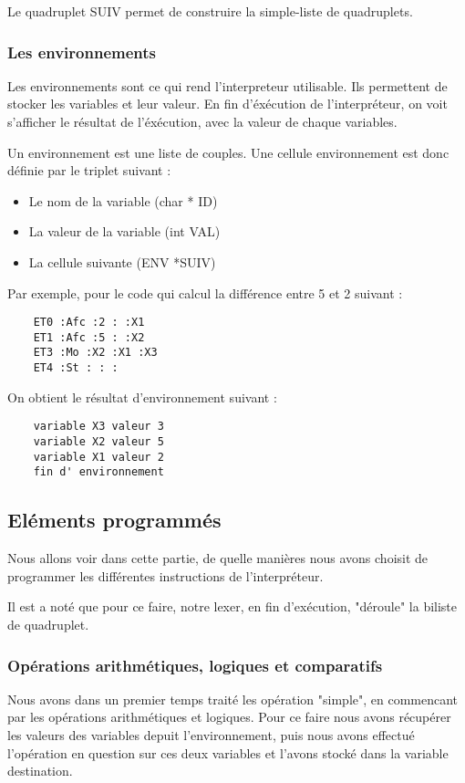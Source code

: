 \documentclass{article}
\begin{document}
Le quadruplet SUIV permet de construire la simple-liste de quadruplets.

\subsubsection{Les environnements}

Les environnements sont ce qui rend l'interpreteur utilisable. Ils permettent de stocker les variables et leur valeur.
En fin d'éxécution de l'interpréteur, on voit s'afficher le résultat de l'éxécution, avec la valeur de chaque variables.

Un environnement est une liste de couples. Une cellule environnement est donc définie par le triplet suivant :

\begin{itemize}
\item Le nom de la variable (char * ID)
\item La valeur de la variable (int VAL)
\item La cellule suivante (ENV *SUIV)
\end{itemize}

\bigbreak
Par exemple, pour le code qui calcul la différence entre 5 et 2 suivant :
\begin{lstlisting}
    ET0 :Afc :2 : :X1
    ET1 :Afc :5 : :X2
    ET3 :Mo :X2 :X1 :X3
    ET4 :St : : :
\end{lstlisting}

On obtient le résultat d'environnement suivant :

\begin{lstlisting}
    variable X3 valeur 3
    variable X2 valeur 5
    variable X1 valeur 2
    fin d' environnement
\end{lstlisting}


\subsection{Eléments programmés}

Nous allons voir dans cette partie, de quelle manières nous avons choisit de programmer les différentes instructions de l'interpréteur.

Il est a noté que pour ce faire, notre lexer, en fin d'exécution, "déroule" la biliste de quadruplet.
\subsubsection{Opérations arithmétiques, logiques et comparatifs}
Nous avons dans un premier temps traité les opération "simple", en commencant par les opérations arithmétiques et logiques.
Pour ce faire nous avons récupérer les valeurs des variables depuit l'environnement, puis nous avons effectué l'opération en question sur ces deux variables et l'avons stocké dans la variable destination.
\end{document}
